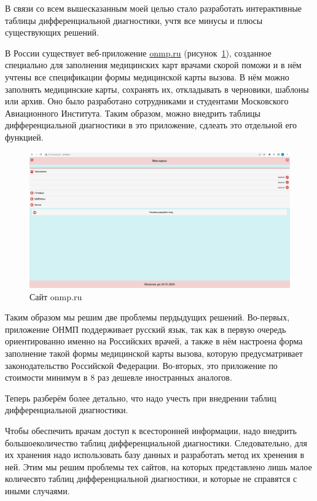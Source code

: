 В связи со всем вышесказанным моей целью стало разработать интерактивные таблицы дифференциальной диагностики, учтя все минусы и плюсы существующих решений. 

В России существует веб-приложение \url{onmp.ru} \cite{onmp} (рисунок~\ref{fig:onmp0}), созданное специально для заполнения медицинских карт врачами скорой поможи и в нём учтены все спецификации формы медицинской карты вызова. В нём можно заполнять медицинские карты, сохранять их, откладывать в черновики, шаблоны или архив. Оно было разработано сотрудниками и студентами Московского Авиационного Института. Таким образом, можно внедрить таблицы дифференциальной диагностики в это приложение, сдлеать это отдельной его функцией. 

\begin{figure}
  \includegraphics[scale=0.3]{src/onmp0.png}
  \caption{Сайт onmp.ru}
  \label{fig:onmp0}
\end{figure}

Таким образом мы решим две проблемы пердыдущих решений. Во-первых, приложение ОНМП поддерживает русский язык, так как в первую очередь ориентированно именно на Российских врачей, а также в нём настроена форма заполнение такой формы медицинской карты вызова, которую предусматривает законодательство Российской Федерации. Во-вторых, это приложение по стоимости минимум в 8 раз дешевле иностранных аналогов.

Теперь разберём более детально, что надо учесть при внедрении таблиц дифференциальной диагностики.

Чтобы обеспечить врачам доступ к всесторонней информации, надо внедрить большоеколичество таблиц дифференциальной диагностики. Следовательно, для их хранения надо использовать базу данных и разработать метод их хренения в ней.  Этим мы решим проблемы тех сайтов, на которых представлено лишь малое количесвто таблиц дифференциальной диагностики, и которые не справятся с иными случаями.

